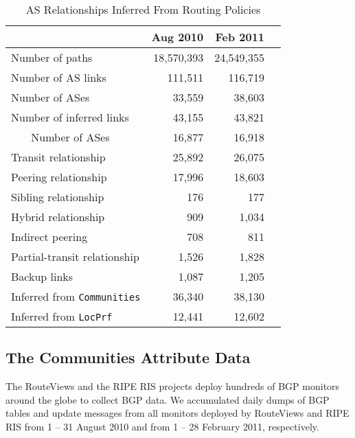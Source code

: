\documentclass[conference]{IEEEtran}
\begin{document}
\begin{center}
\begin{table}[t]
\centering	
               \caption{AS Relationships Inferred From Routing Policies}
		\begin{tabular}{ lrrr}
		\toprule
			
           & \textbf{Aug 2010} & \textbf{Feb 2011} \\
			\hline
	    Number of paths  &18,570,393  &  24,549,355 \\		
			Number of AS links & 111,511 &  116,719\\
			Number of ASes & 33,559 &  38,603\\
			\hline
         Number of inferred links  & 43,155 & 43,821 \\
                  {~~~} Number of ASes & 16,877 & 16,918  \\
         \bottomrule 
		  
		Transit relationship & 25,892 & 26,075 \\
                 Peering relationship  & 17,996 & 18,603 \\
                 Sibling  relationship & 176 & 177 \\
		  \hline
                  Hybrid relationship & 909 & 1,034 \\
                 Indirect peering & 708 & 811\\
                  Partial-transit  relationship & 1,526 & 1,828\\
                  Backup links  & 1,087 & 1,205 \\
 \bottomrule 
                 Inferred from {\tt Communities}  & 36,340 & 38,130 \\
                 Inferred from {\tt LocPrf}  & 12,441 & 12,602 \\
		  \bottomrule 		
		  \end{tabular}
	\label{tab:gtRels}
\end{table}
\end{center} 

\subsection{The   {Communities} Attribute Data}

The RouteViews  \cite{routeviews} and the RIPE RIS \cite{ripe3} projects deploy hundreds of BGP monitors around the globe to collect BGP data.  We accumulated daily dumps of BGP tables and update messages from all  monitors deployed by RouteViews and RIPE RIS from 1 -- 31 August 2010 and from 1 -- 28 February 2011, respectively. 
\end{document}
